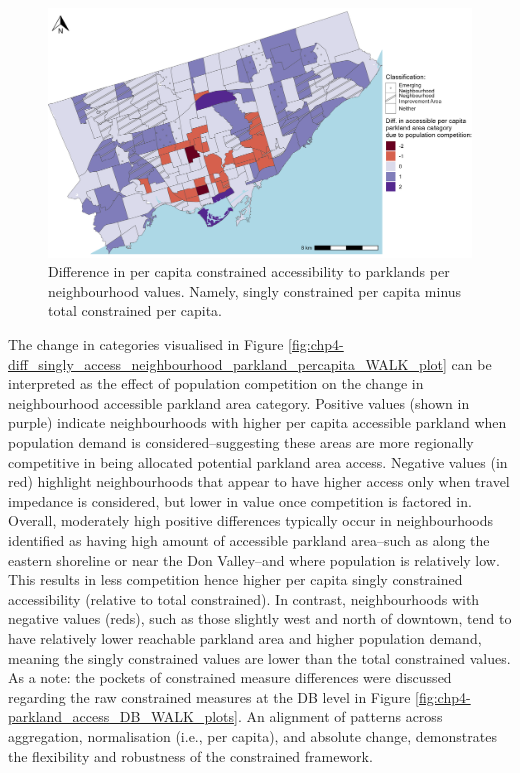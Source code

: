 \documentclass[
11pt, %
oneside, %
english, %
singlespacing, %
]{macthesis} %
\begin{document}
\begin{figure}

{\centering \includegraphics[width=6in]{./data/figures/chp4-diff_singly_access_neighbourhood_parkland_percapita_WALK_plot} 

}

\caption{\label{fig:chp4-diff_singly_access_neighbourhood_parkland_percapita_WALK_plot} Difference in per capita constrained accessibility to parklands per neighbourhood values. Namely, singly constrained per capita minus total constrained per capita. }\label{fig:unnamed-chunk-63}
\end{figure}

The change in categories visualised in Figure \ref{fig:chp4-diff_singly_access_neighbourhood_parkland_percapita_WALK_plot} can be interpreted as the effect of population competition on the change in neighbourhood accessible parkland area category. Positive values (shown in purple) indicate neighbourhoods with higher per capita accessible parkland when population demand is considered--suggesting these areas are more regionally competitive in being allocated potential parkland area access. Negative values (in red) highlight neighbourhoods that appear to have higher access only when travel impedance is considered, but lower in value once competition is factored in. Overall, moderately high positive differences typically occur in neighbourhoods identified as having high amount of accessible parkland area--such as along the eastern shoreline or near the Don Valley--and where population is relatively low. This results in less competition hence higher per capita singly constrained accessibility (relative to total constrained). In contrast, neighbourhoods with negative values (reds), such as those slightly west and north of downtown, tend to have relatively lower reachable parkland area and higher population demand, meaning the singly constrained values are lower than the total constrained values. As a note: the pockets of constrained measure differences were discussed regarding the raw constrained measures at the DB level in Figure \ref{fig:chp4-parkland_access_DB_WALK_plots}. An alignment of patterns across aggregation, normalisation (i.e., per capita), and absolute change, demonstrates the flexibility and robustness of the constrained framework.
\end{document}
